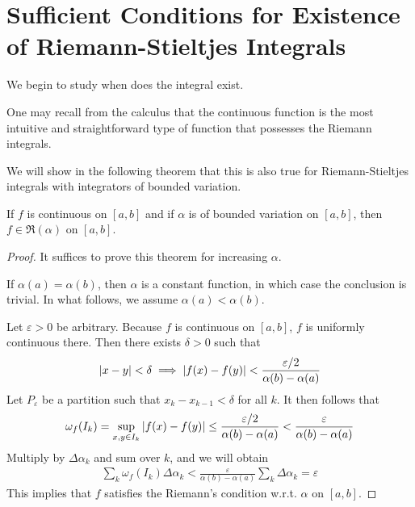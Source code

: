 \documentclass[thmcnt=section, color=blue, 12pt]{my-elegantbook}
\begin{document}
\section{Sufficient Conditions for Existence of Riemann-Stieltjes Integrals}

We begin to study when does the integral exist.

One may recall from the calculus that the continuous function is the most intuitive
and straightforward type of function that possesses the Riemann integrals.

We will show in the following theorem that this is also true
for Riemann-Stieltjes
integrals with integrators of bounded variation.


\begin{theorem} \label{thm:16}
	If $f$ is continuous on $[a, b]$ and if $\alpha$ is of bounded variation on $[a, b]$,
	then $f \in \mathfrak{R}(\alpha)$ on $[a, b]$.
\end{theorem}

\begin{proof}
	It suffices to prove this theorem for increasing $\alpha$.

	If $\alpha(a) = \alpha(b)$, then $\alpha$ is a constant function,
	in which case the conclusion is trivial.
	In what follows, we assume $\alpha(a) < \alpha(b)$.

	Let $\varepsilon > 0$ be arbitrary.
	Because $f$ is continuous on $[a, b]$, $f$ is uniformly continuous there.
	Then there exists $\delta > 0$ such that
	\begin{align*}
		\left\lvert x - y \right\rvert < \delta \implies
		\left\lvert f(x) - f(y) \right\rvert
		< \frac{\varepsilon / 2}{\alpha(b) - \alpha(a)}
	\end{align*}
	Let $P_\varepsilon$ be a partition such that $x_k - x_{k-1} < \delta$ for all $k$.
	It then follows that
	\begin{align*}
		\omega_f(I_k) = \sup_{x, y \in I_k} \left\lvert f(x) - f(y) \right\rvert
		\leq \frac{\varepsilon / 2}{\alpha(b) - \alpha(a)}
		< \frac{\varepsilon}{\alpha(b) - \alpha(a)}
	\end{align*}
	Multiply by $\Delta \alpha_k$ and sum over $k$, and we will obtain
	\begin{align*}
		\sum_{k} \omega_f(I_k) \Delta \alpha_k
		< \frac{\varepsilon}{\alpha(b) - \alpha(a)} \sum_{k} \Delta \alpha_k
		= \varepsilon
	\end{align*}
	This implies that $f$ satisfies the Riemann's condition w.r.t. $\alpha$ on $[a, b]$.
\end{proof}
\end{document}
